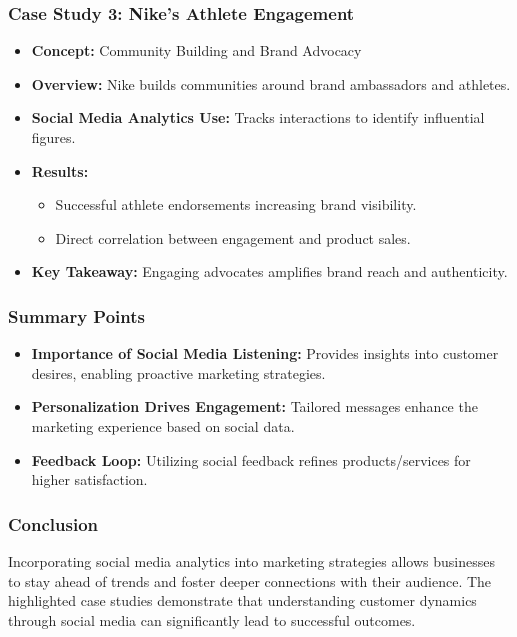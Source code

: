 \documentclass{beamer}
\begin{document}
\begin{frame}[fragile]
    \frametitle{Case Study 3: Nike’s Athlete Engagement}
    \begin{itemize}
        \item \textbf{Concept:} Community Building and Brand Advocacy
        \item \textbf{Overview:} Nike builds communities around brand ambassadors and athletes.
        \item \textbf{Social Media Analytics Use:} Tracks interactions to identify influential figures.
        \item \textbf{Results:}
            \begin{itemize}
                \item Successful athlete endorsements increasing brand visibility.
                \item Direct correlation between engagement and product sales.
            \end{itemize}
        \item \textbf{Key Takeaway:} Engaging advocates amplifies brand reach and authenticity.
    \end{itemize}
\end{frame}

\begin{frame}[fragile]
    \frametitle{Summary Points}
    \begin{itemize}
        \item \textbf{Importance of Social Media Listening:} Provides insights into customer desires, enabling proactive marketing strategies.
        \item \textbf{Personalization Drives Engagement:} Tailored messages enhance the marketing experience based on social data.
        \item \textbf{Feedback Loop:} Utilizing social feedback refines products/services for higher satisfaction.
    \end{itemize}
\end{frame}

\begin{frame}[fragile]
    \frametitle{Conclusion}
    Incorporating social media analytics into marketing strategies allows businesses to stay ahead of trends and foster deeper connections with their audience. The highlighted case studies demonstrate that understanding customer dynamics through social media can significantly lead to successful outcomes.
\end{frame}
\end{document}
